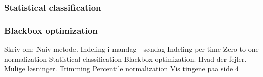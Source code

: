 \begin{table}[!ht]
\centering  %
\caption{Results from the simple classification approach} %
\label{table:naiveTrainingApproach} %
\end{table}

\subsubsection{Statistical classification}

\subsubsection{Blackbox optimization}

Skriv om:
	Naiv metode.
	Indeling i mandag - søndag
	Indeling per time
	Zero-to-one normalization
	Statistical classification
	Blackbox optimization.
	Hvad der fejler.
	Mulige løsninger.
	Trimming
	Percentile normalization
	Vis tingene paa side 4
